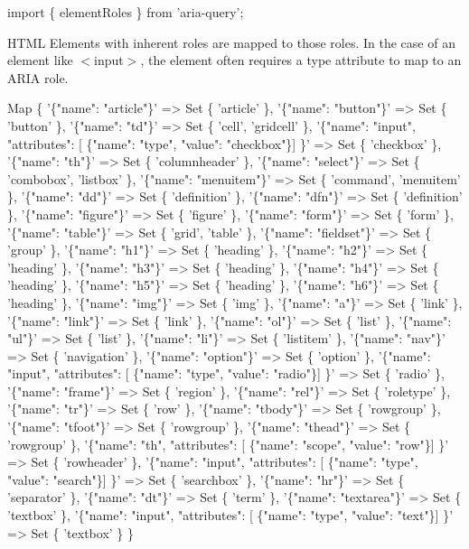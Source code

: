 \begin{DoxyCode}
import \{ elementRoles \} from 'aria-query';
\end{DoxyCode}


H\+T\+ML Elements with inherent roles are mapped to those roles. In the case of an element like {\ttfamily $<$input$>$}, the element often requires a {\ttfamily type} attribute to map to an A\+R\+IA role.


\begin{DoxyCode}
Map \{
  '\{"name": "article"\}' => Set \{ 'article' \},
  '\{"name": "button"\}' => Set \{ 'button' \},
  '\{"name": "td"\}' => Set \{ 'cell', 'gridcell' \},
  '\{"name": "input", "attributes": [ \{"name": "type", "value": "checkbox"\}] \}' => Set \{ 'checkbox' \},
  '\{"name": "th"\}' => Set \{ 'columnheader' \},
  '\{"name": "select"\}' => Set \{ 'combobox', 'listbox' \},
  '\{"name": "menuitem"\}' => Set \{ 'command', 'menuitem' \},
  '\{"name": "dd"\}' => Set \{ 'definition' \},
  '\{"name": "dfn"\}' => Set \{ 'definition' \},
  '\{"name": "figure"\}' => Set \{ 'figure' \},
  '\{"name": "form"\}' => Set \{ 'form' \},
  '\{"name": "table"\}' => Set \{ 'grid', 'table' \},
  '\{"name": "fieldset"\}' => Set \{ 'group' \},
  '\{"name": "h1"\}' => Set \{ 'heading' \},
  '\{"name": "h2"\}' => Set \{ 'heading' \},
  '\{"name": "h3"\}' => Set \{ 'heading' \},
  '\{"name": "h4"\}' => Set \{ 'heading' \},
  '\{"name": "h5"\}' => Set \{ 'heading' \},
  '\{"name": "h6"\}' => Set \{ 'heading' \},
  '\{"name": "img"\}' => Set \{ 'img' \},
  '\{"name": "a"\}' => Set \{ 'link' \},
  '\{"name": "link"\}' => Set \{ 'link' \},
  '\{"name": "ol"\}' => Set \{ 'list' \},
  '\{"name": "ul"\}' => Set \{ 'list' \},
  '\{"name": "li"\}' => Set \{ 'listitem' \},
  '\{"name": "nav"\}' => Set \{ 'navigation' \},
  '\{"name": "option"\}' => Set \{ 'option' \},
  '\{"name": "input", "attributes": [ \{"name": "type", "value": "radio"\}] \}' => Set \{ 'radio' \},
  '\{"name": "frame"\}' => Set \{ 'region' \},
  '\{"name": "rel"\}' => Set \{ 'roletype' \},
  '\{"name": "tr"\}' => Set \{ 'row' \},
  '\{"name": "tbody"\}' => Set \{ 'rowgroup' \},
  '\{"name": "tfoot"\}' => Set \{ 'rowgroup' \},
  '\{"name": "thead"\}' => Set \{ 'rowgroup' \},
  '\{"name": "th", "attributes": [ \{"name": "scope", "value": "row"\}] \}' => Set \{ 'rowheader' \},
  '\{"name": "input", "attributes": [ \{"name": "type", "value": "search"\}] \}' => Set \{ 'searchbox' \},
  '\{"name": "hr"\}' => Set \{ 'separator' \},
  '\{"name": "dt"\}' => Set \{ 'term' \},
  '\{"name": "textarea"\}' => Set \{ 'textbox' \},
  '\{"name": "input", "attributes": [ \{"name": "type", "value": "text"\}] \}' => Set \{ 'textbox' \}
\}
\end{DoxyCode}


